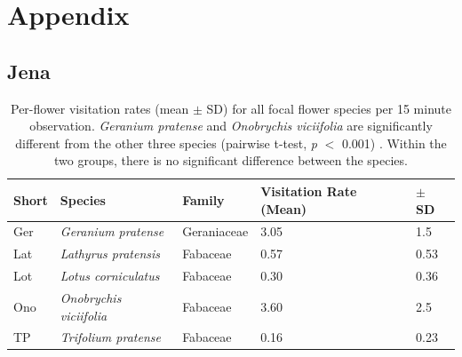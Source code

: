 \label{ch:appendix_jena}

\section{Appendix}

\subsection{Jena}

\begin{table}[!htbp]
\centering
  \caption{Per-flower visitation rates (mean $\pm$ SD) for all focal flower species per 15 minute observation. \textit{Geranium pratense} and \textit{Onobrychis viciifolia} are significantly different from the other three species (pairwise t-test, \textit{p} $<$ 0.001) . Within the two groups, there is no significant difference between the species. }
    \begin{tabular}{l l l l l}
    \toprule
    \textbf {Short} & \textbf{Species} & \textbf{Family} &\textbf{Visitation Rate (Mean)} & \textbf{ $\pm$ SD} \\
    \midrule
    Ger  & \textit{Geranium pratense} & Geraniaceae & 3.05 & 1.5 \\ %
    Lat  & \textit{Lathyrus pratensis} & Fabaceae & 0.57 & 0.53 \\ %
    Lot  & \textit{Lotus corniculatus} & Fabaceae & 0.30 & 0.36 \\  %
    Ono  & \textit{Onobrychis viciifolia} & Fabaceae & 3.60  &  2.5 \\ %
    TP   & \textit{Trifolium pratense} & Fabaceae & 0.16 & 0.23 \\ %
    \bottomrule
    \end{tabular}%
\label{tab:VR_spec}
\end{table}%


